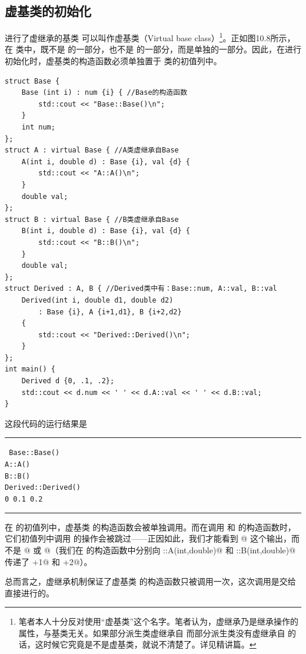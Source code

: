 \subsection*{虚基类的初始化}
进行了虚继承的基类 \lstinline@Base@ 可以叫作虚基类（Virtual base class）\footnote{笔者本人十分反对使用``虚基类''这个名字。笔者认为，虚继承乃是继承操作的属性，与基类无关。如果部分派生类虚继承自 \lstinline@Base@ 而部分派生类没有虚继承自 \lstinline@Base@ 的话，这时候它究竟是不是虚基类，就说不清楚了。详见精讲篇。}。正如图10.8所示，在 \lstinline@Derived@ 类中，\lstinline@Base@ 既不是 \lstinline@A@ 的一部分，也不是 \lstinline@B@ 的一部分，而是单独的一部分。因此，在进行初始化时，虚基类的构造函数必须单独置于 \lstinline@Derived@ 类的初值列中。
\begin{lstlisting}
struct Base {
    Base (int i) : num {i} { //Base的构造函数
        std::cout << "Base::Base()\n";
    }
    int num;
};
struct A : virtual Base { //A类虚继承自Base
    A(int i, double d) : Base {i}, val {d} {
        std::cout << "A::A()\n";
    }
    double val;
};
struct B : virtual Base { //B类虚继承自Base
    B(int i, double d) : Base {i}, val {d} {
        std::cout << "B::B()\n";
    }
    double val;
};
struct Derived : A, B { //Derived类中有：Base::num, A::val, B::val
    Derived(int i, double d1, double d2)
        : Base {i}, A {i+1,d1}, B {i+2,d2}
    {
        std::cout << "Derived::Derived()\n";
    }
};
int main() {
    Derived d {0, .1, .2};
    std::cout << d.num << ' ' << d.A::val << ' ' << d.B::val;
}
\end{lstlisting}
这段代码的运行结果是\\\noindent\rule{\linewidth}{.2pt}\texttt{
Base::Base()\\
A::A()\\
B::B()\\
Derived::Derived()\\
0 0.1 0.2
}\\\noindent\rule{\linewidth}{.2pt}\par
在 \lstinline@Derived@ 的初值列中，虚基类 \lstinline@Base@ 的构造函数会被单独调用。而在调用 \lstinline@A@ 和 \lstinline@B@ 的构造函数时，它们初值列中调用 \lstinline@Base@ 的操作会被跳过——正因如此，我们才能看到 @ 这个输出，而不是 @ 或 @（我们在 \lstinline@Derived@ 的构造函数中分别向 \lstinline@A::A(int,double)@ 和 \lstinline@B::B(int,double)@ 传递了 \lstinline@i+1@ 和 \lstinline@i+2@）。\par
总而言之，虚继承机制保证了虚基类 \lstinline@Base@ 的构造函数只被调用一次，这次调用是交给 \lstinline@Derived@ 直接进行的。\par
